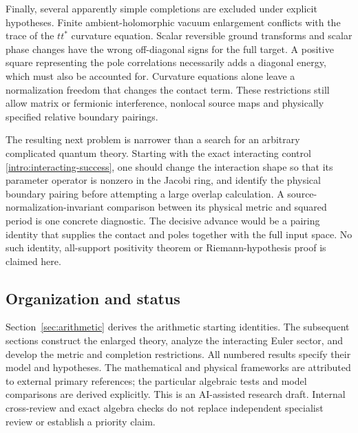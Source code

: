 Finally, several apparently simple completions are excluded under explicit hypotheses. Finite ambient-holomorphic vacuum enlargement conflicts with the trace of the $tt^*$ curvature equation. Scalar reversible ground transforms and scalar phase changes have the wrong off-diagonal signs for the full target. A positive square representing the pole correlations necessarily adds a diagonal energy, which must also be accounted for. Curvature equations alone leave a normalization freedom that changes the contact term. These restrictions still allow matrix or fermionic interference, nonlocal source maps and physically specified relative boundary pairings.

The resulting next problem is narrower than a search for an arbitrary complicated quantum theory. Starting with the exact interacting control \eqref{intro:interacting-success}, one should change the interaction shape so that its parameter operator is nonzero in the Jacobi ring, and identify the physical boundary pairing before attempting a large overlap calculation. A source-normalization-invariant comparison between its physical metric and squared period is one concrete diagnostic. The decisive advance would be a pairing identity that supplies the contact and poles together with the full input space. No such identity, all-support positivity theorem or Riemann-hypothesis proof is claimed here.

\subsection{Organization and status}
Section~\ref{sec:arithmetic} derives the arithmetic starting identities. The subsequent sections construct the enlarged theory, analyze the interacting Euler sector, and develop the metric and completion restrictions. All numbered results specify their model and hypotheses. The mathematical and physical frameworks are attributed to external primary references; the particular algebraic tests and model comparisons are derived explicitly. This is an AI-assisted research draft. Internal cross-review and exact algebra checks do not replace independent specialist review or establish a priority claim.
